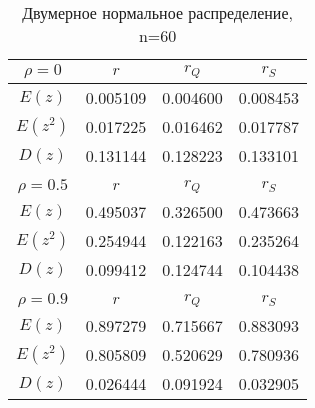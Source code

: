 \begin{table}[H]
    \centering
    \begin{tabular}{c|c|c|c}
        $\rho=0$ & $r$ & $r_{Q}$ & $r_{S}$ \\
        \hline
        $E(z)$ & 0.005109 & 0.004600 & 0.008453 \\
        $E(z^2)$ & 0.017225 & 0.016462 & 0.017787 \\
        $D(z)$ & 0.131144 & 0.128223 & 0.133101 \\
        \multicolumn{4}{c}{} \\
        $\rho=0.5$ & $r$ & $r_{Q}$ & $r_{S}$ \\
        \hline
        $E(z)$ & 0.495037 & 0.326500 & 0.473663 \\
        $E(z^2)$ & 0.254944 & 0.122163 & 0.235264 \\
        $D(z)$ & 0.099412 & 0.124744 & 0.104438 \\
        \multicolumn{4}{c}{} \\
        $\rho=0.9$ & $r$ & $r_{Q}$ & $r_{S}$ \\
        \hline
        $E(z)$ & 0.897279 & 0.715667 & 0.883093 \\
        $E(z^2)$ & 0.805809 & 0.520629 & 0.780936 \\
        $D(z)$ & 0.026444 & 0.091924 & 0.032905 \\
    \end{tabular}
    \caption{Двумерное нормальное распределение, n=60}
    \label{tab:norm60}
\end{table}